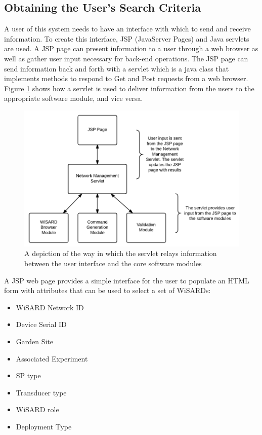 \subsection{Obtaining the User's Search Criteria}
A user of this system needs to have an interface with which to send and receive information. To create this interface, JSP (JavaServer Pages) and Java servlets are used. A JSP page can present information to a user through a web browser as well as gather user input necessary for back-end operations. The JSP page can send information back and forth with a servlet which is a java class that implements methods to respond to Get and Post requests from a web browser. Figure \ref{fig:jsp_interaction} shows how a servlet is used to deliver information from the users to the appropriate software module, and vice versa. 

\begin{figure}[H]
	\centering
	\includegraphics[width=\textwidth]{figures/jsp_interaction.png}
	\caption{A depiction of the way in which the servlet relays information between the user interface and the core software modules }
	\label{fig:jsp_interaction}
\end{figure} 

A JSP web page provides a simple interface for the user to populate an HTML form with attributes that can be used to select a set of WiSARDs:

\begin{itemize}
	\item WiSARD Network ID
	\item Device Serial ID
	\item Garden Site
	\item Associated Experiment
	\item SP type
	\item Transducer type
	\item WiSARD role
	\item Deployment Type
\end{itemize} 

